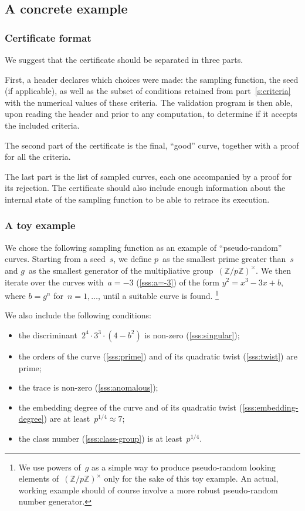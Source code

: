 \documentclass[twocolumn,letterpaper,10pt]{article}
\begin{document}
\subsection{A concrete example}

\subsubsection{Certificate format}

We suggest that the certificate should be separated in three parts.

First, a header declares which choices were made:
the sampling function, the seed (if applicable),
as well as the subset of conditions retained from part~\ref{s:criteria}
with the numerical values of these criteria.
The validation program is then able,
upon reading the header and prior to any computation,
to determine if it accepts the included criteria.

The second part of the certificate is the final, “good” curve,
together with a proof for all the criteria.

The last part is the list of sampled curves,
each one accompanied by a proof for its rejection.
The certificate should also include enough information about
the internal state of the sampling function
to be able to retrace its execution.

\subsubsection{A toy example}

We chose the following sampling function as an example
of “pseudo-random” curves.
Starting from a seed~$s$, we define $p$~as the smallest prime greater than~$s$
and $g$~as the smallest generator of the multipliative group~$(ℤ/pℤ)^{×}$.
We then iterate over the curves with~$a = -3$ (\ref{sss:a=-3})
of the form $y^2 = x^3 - 3 x + b$, where $b = g^n$ for~$n = 1, …$,
until a suitable curve is found.%
\footnote{We use powers of~$g$ as a simple way to produce pseudo-random
looking elements of~$(ℤ/pℤ)^{×}$ only for the sake of this toy example.
An actual, working example should of course involve a more robust
pseudo-random number generator.}

We also include the following conditions:
\begin{itemize} \itemsep 0pt \parskip 0pt
\item the discriminant~$2^4·3^3·(4-b^2)$ is non-zero
(\ref{sss:singular});
\item the orders of the curve (\ref{sss:prime}) and of its quadratic twist
(\ref{sss:twist}) are prime;
\item the trace is non-zero (\ref{sss:anomalous});
\item the embedding degree of the curve and of its quadratic twist
(\ref{sss:embedding-degree}) are at least~$p^{1/4} ≈ 7$;
\item the class number (\ref{sss:class-group}) is at least~$p^{1/4}$.
\end{itemize}
\end{document}
